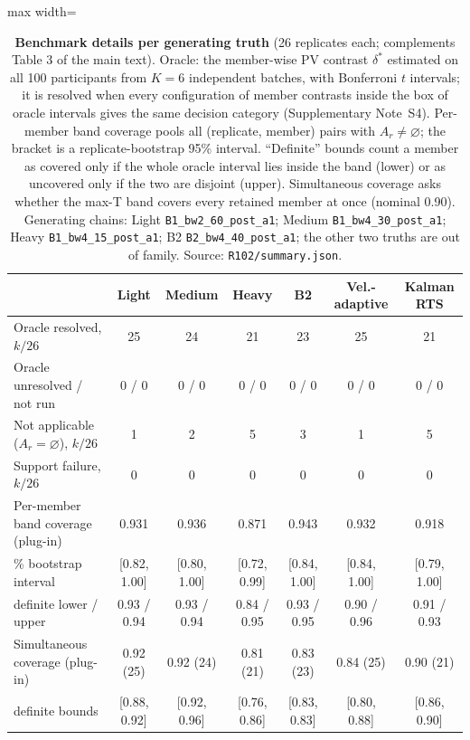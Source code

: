 \begin{table}[ht]
\centering
\caption{\textbf{Benchmark details per generating truth} (26 replicates each; complements Table 3 of the main text). Oracle: the member-wise PV contrast $\delta^*$ estimated on all 100 participants from $K = 6$ independent batches, with Bonferroni $t$ intervals; it is resolved when every configuration of member contrasts inside the box of oracle intervals gives the same decision category (Supplementary Note~S4). Per-member band coverage pools all (replicate, member) pairs with $A_r \neq \varnothing$; the bracket is a replicate-bootstrap 95\% interval. ``Definite'' bounds count a member as covered only if the whole oracle interval lies inside the band (lower) or as uncovered only if the two are disjoint (upper). Simultaneous coverage asks whether the max-T band covers every retained member at once (nominal 0.90). Generating chains: Light \texttt{B1\_bw2\_60\_post\_a1}; Medium \texttt{B1\_bw4\_30\_post\_a1}; Heavy \texttt{B1\_bw4\_15\_post\_a1}; B2 \texttt{B2\_bw4\_40\_post\_a1}; the other two truths are out of family. Source: \texttt{R102/summary.json}.}
\label{tab:s3}
\footnotesize
\setlength{\tabcolsep}{3pt}
\begin{adjustbox}{max width=\textwidth}
\begin{tabular}{@{}>{\raggedright\arraybackslash}p{3.6cm}cccccc@{}}
\toprule
 & Light & Medium & Heavy & B2 & Vel.-adaptive & Kalman RTS \\
\midrule
Oracle resolved, $k/26$ & 25 & 24 & 21 & 23 & 25 & 21 \\
Oracle unresolved / not run & 0 / 0 & 0 / 0 & 0 / 0 & 0 / 0 & 0 / 0 & 0 / 0 \\
Not applicable ($A_r = \varnothing$), $k/26$ & 1 & 2 & 5 & 3 & 1 & 5 \\
Support failure, $k/26$ & 0 & 0 & 0 & 0 & 0 & 0 \\
Per-member band coverage (plug-in) & 0.931 & 0.936 & 0.871 & 0.943 & 0.932 & 0.918 \\
\quad 95\% bootstrap interval & [0.82, 1.00] & [0.80, 1.00] & [0.72, 0.99] & [0.84, 1.00] & [0.84, 1.00] & [0.79, 1.00] \\
\quad definite lower / upper & 0.93 / 0.94 & 0.93 / 0.94 & 0.84 / 0.95 & 0.93 / 0.95 & 0.90 / 0.96 & 0.91 / 0.93 \\
Simultaneous coverage (plug-in) & 0.92 (25) & 0.92 (24) & 0.81 (21) & 0.83 (23) & 0.84 (25) & 0.90 (21) \\
\quad definite bounds & [0.88, 0.92] & [0.92, 0.96] & [0.76, 0.86] & [0.83, 0.83] & [0.80, 0.88] & [0.86, 0.90] \\
\bottomrule
\end{tabular}
\end{adjustbox}
\end{table}

